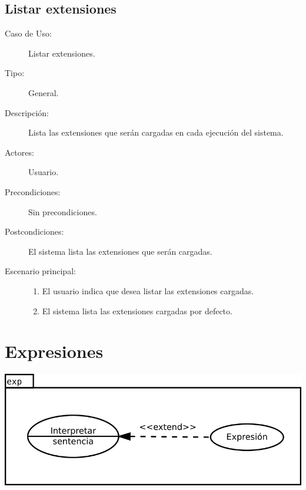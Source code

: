 \subsection{Listar extensiones}
\begin{framed}
\FloatBarrier
\begin{description}
   \item[Caso de Uso:]  Listar extensiones.
   \item[Tipo:] General.
   \item[Descripción:] 
   Lista las extensiones que serán cargadas en cada ejecución del sistema.
   \item[Actores:] 
   Usuario.
   \item[Precondiciones:] 
   Sin precondiciones.
   \item[Postcondiciones:] 
   El sistema lista las extensiones que serán cargadas.
   \item[Escenario principal:] \hfill
   \begin{enumerate}
   \item El usuario indica que desea listar las extensiones cargadas.
   \item El sistema lista las extensiones cargadas por defecto. 
   \end{enumerate}
\end{description}
 \FloatBarrier
\end{framed}


\pagebreak
\section {Expresiones}
\begin{center}
\includegraphics[scale=0.5]{exp.png} \\
\end{center}

